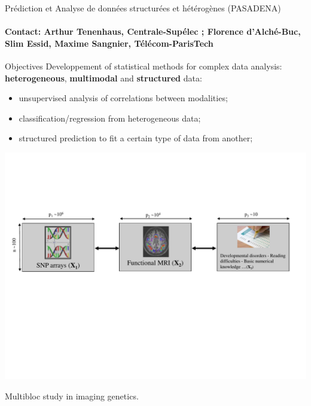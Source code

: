 \begin{frame}{Prédiction et Analyse de données structurées et hétérogènes (PASADENA) }
\framesubtitle{Contact: Arthur Tenenhaus, Centrale-Supélec ; Florence d’Alché-Buc, Slim Essid,  Maxime Sangnier, Télécom-ParisTech}

\begin{alertblock}{Objectives}
Developpement of statistical methods for complex data analysis: \textbf{heterogeneous}, \textbf{multimodal} and \textbf{structured} data:
\begin{itemize}
\item unsupervised analysis of correlations between modalities;
\item classification/regression from heterogeneous data;
\item structured prediction to fit a certain type of data from another;
\end{itemize}
\end{alertblock}


\begin{minipage}[c]{.7\linewidth}
\includegraphics[trim = 0mm 90mm 0mm 50mm, clip, width=\linewidth]{Images/pasadena_poster_I.pdf}
\end{minipage}\hfill
\begin{minipage}[c]{.28\linewidth}
Multibloc study in imaging genetics.
\end{minipage}


\end{frame}


